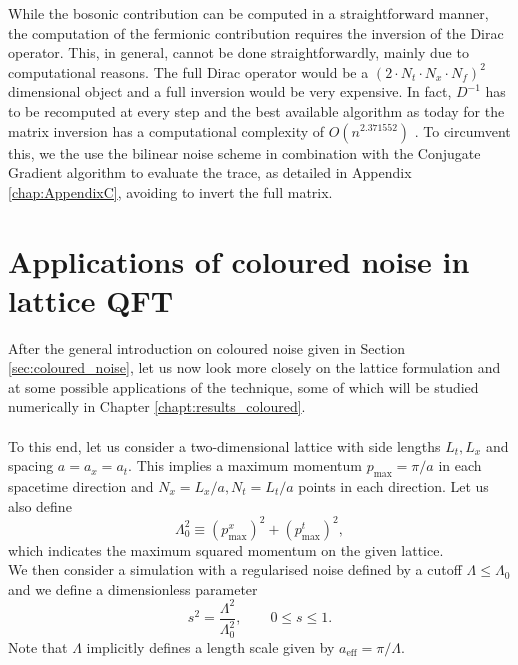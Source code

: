 While the bosonic contribution can be computed in a straightforward manner, the computation of the fermionic contribution requires the inversion of the Dirac operator. This, in general, cannot be done straightforwardly, mainly due to computational reasons.
The full Dirac operator would be a $(2 \cdot N_t \cdot N_x \cdot N_f)^2$ dimensional object and a full inversion would be very expensive. In fact, $D^{-1}$ has to be recomputed at every step and the best available algorithm as today for the matrix inversion has a computational complexity of $O(n^{2.371552})$ \cite{williams2023new}. To circumvent this, we the use the bilinear noise scheme \cite{bilinearnoise1,bilinearnoise2} in combination with the Conjugate Gradient algorithm to evaluate the trace, as detailed in Appendix \ref{chap:AppendixC}, avoiding to invert the full matrix.

\newpage


\section{Applications of coloured noise in lattice QFT}
\label{sec:lattice_with_coloured_noise}
After the general introduction on coloured noise given in Section \ref{sec:coloured_noise}, let us now look more closely on the lattice formulation and at some possible applications of the technique, some of which will be studied numerically in Chapter \ref{chapt:results_coloured}. \\~\\
To this end, let us consider a two-dimensional lattice with side lengths $L_t, L_x$ and spacing $a = a_x = a_t$. This implies a maximum momentum $p_\text{max} = \pi / a$ in each spacetime direction and $N_x=L_x/a, N_t=L_t/a$ points in each direction. Let us also define 
\begin{equation}
	\Lambda_0^2 \equiv (p^x_\text{max})^2 + (p^t_\text{max})^2,
\end{equation}
which indicates the maximum squared momentum on the given lattice. \\
We then consider a simulation with a regularised noise defined by a cutoff $\Lambda \leq \Lambda_0$ and we define a dimensionless parameter
\begin{equation}
	s^2 = \frac{\Lambda^2}{\Lambda_0^2}, \qquad 0 \leq s \leq 1.
\end{equation}
Note that $\Lambda$ implicitly defines a length scale given by  $a_\text{eff} = \pi/\Lambda$.\\

